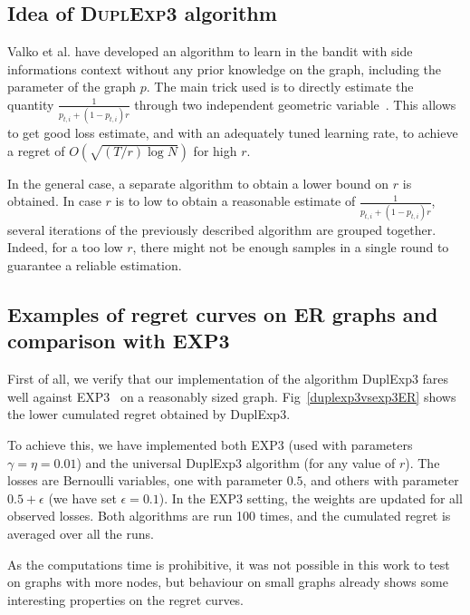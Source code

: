 \documentclass[10pt,a4paper]{scrartcl}
\begin{document}
\subsection{Idea of \textsc{DuplExp3} algorithm}
Valko et al. have developed an algorithm to learn in the bandit with side informations context without any prior knowledge on the graph, including the parameter of the graph $p$. The main trick used is to directly estimate the quantity $\frac{1}{p_{t,i}+(1-p_{t,i})r}$ through two independent geometric variable~\cite{neu2013efficient}. This allows to get good loss estimate, and with an adequately tuned learning rate, to achieve a regret of $O(\sqrt{(T/r)\log N})$ for high $r$.


In the general case, a separate algorithm to obtain a lower bound on $r$ is obtained. In case $r$ is to low to obtain a reasonable estimate of $\frac{1}{p_{t,i}+(1-p_{t,i})r}$, several iterations of the previously described algorithm are grouped together. Indeed, for a too low $r$, there might not be enough samples in a single round to guarantee a reliable estimation. 


\subsection{Examples of regret curves on ER graphs and comparison with EXP3}

First of all, we verify that our implementation of the algorithm DuplExp3 fares well against EXP3~\cite{auer2002nonstochastic} on a reasonably sized graph. Fig~\ref{duplexp3vsexp3ER} shows the lower cumulated regret obtained by DuplExp3.

To achieve this, we have implemented both EXP3 (used with parameters $\gamma=\eta=0.01$) and the universal DuplExp3 algorithm (for any value of $r$). The losses are Bernoulli variables, one with parameter $0.5$, and others with parameter $0.5 + \epsilon$ (we have set $\epsilon = 0.1$). In the EXP3 setting, the weights are updated for all observed losses. Both algorithms are run 100 times, and the cumulated regret is averaged over all the runs.

As the computations time is prohibitive, it was not possible in this work to test on graphs with more nodes, but behaviour on small graphs already shows some interesting properties on the regret curves. 
\end{document}
